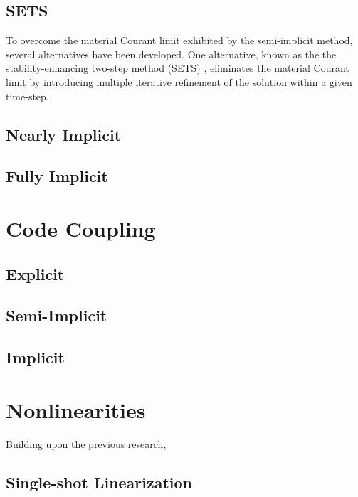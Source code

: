 \subsection{SETS}
\label{subsect:numerics_sets}
To overcome the material Courant limit exhibited by the semi-implicit method, several alternatives have been developed.
One alternative, known as the the stability-enhancing two-step method (SETS) \cite{Mahaffy1982}, eliminates the material Courant limit by introducing multiple iterative refinement of the solution within a given time-step.

\subsection{Nearly Implicit}
\label{subsect:numerics_nearly_implicit}

\subsection{Fully Implicit}
\label{subsect:numerics_fully_implicit}

\section{Code Coupling}
\label{sect:code_coupling}

\subsection{Explicit}
\label{subsect:coupling_explicit}

\subsection{Semi-Implicit}
\label{subsect:coupling_semi_implicit}

\subsection{Implicit}
\label{subsect:coupling_implicit}

\section{Nonlinearities}
\label{sect:nonlinearities}
Building upon the previous research, 


\subsection{Single-shot Linearization}
\label{subsect:single_shot}

